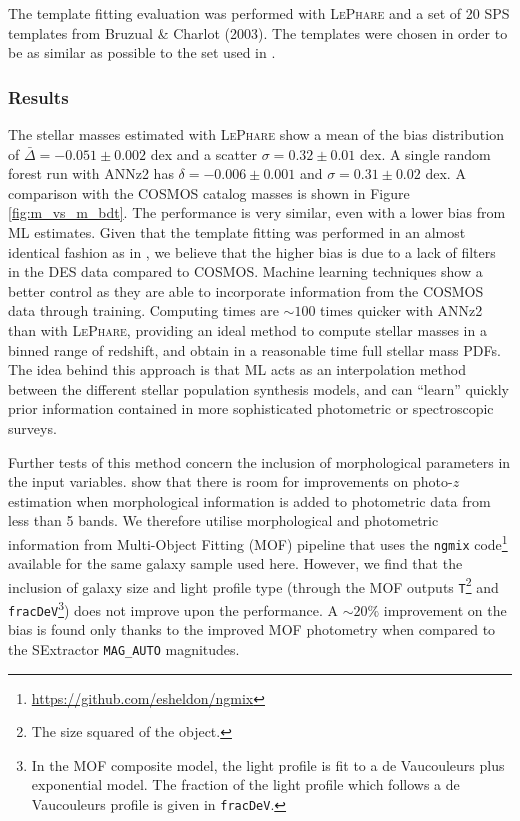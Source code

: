 The template fitting evaluation was performed with \textsc{LePhare} and a set of 20 SPS templates from Bruzual \& Charlot (2003). The templates were chosen in order to be as similar as possible to the set used in \citet{laigle}. 

\subsubsection{Results}
The stellar masses estimated with \textsc{LePhare} show a mean of the bias distribution of $\bar{\Delta}=-0.051\pm 0.002$ dex and a scatter $\sigma = 0.32\pm 0.01$ dex. A single random forest run with ANNz2 has $\delta=-0.006\pm 0.001$ and $\sigma=0.31\pm 0.02$ dex. A comparison with the COSMOS catalog masses is shown in Figure \ref{fig:m_vs_m_bdt}. The performance is very similar, even with a lower bias from ML estimates. Given that the template fitting was performed in an almost identical fashion as in \citet{laigle}, we believe that the higher bias is due to a lack of filters in the DES data compared to COSMOS. Machine learning techniques show a better control as they are able to incorporate information from the COSMOS data through training. Computing times are $\sim 100$ times quicker with ANNz2 than with \textsc{LePhare}, providing an ideal method to compute stellar masses in a binned range of redshift, and obtain in a reasonable time full stellar mass PDFs.
The idea behind this approach is that ML acts as an interpolation method between the different stellar population synthesis models, and can ``learn'' quickly prior information contained in more sophisticated photometric or spectroscopic surveys.

Further tests of this method concern the inclusion of morphological parameters in the input variables. \citet{soo} show that there is room for improvements on photo-$z$ estimation when morphological information is added to photometric data from less than 5 bands. We therefore utilise morphological and photometric information from Multi-Object Fitting (MOF) pipeline that uses the \texttt{ngmix} code\footnote{\url{https://github.com/esheldon/ngmix}} available for the same galaxy sample used here. However, we find that the inclusion of galaxy size and light profile type (through the MOF outputs \texttt{T}\footnote{The size squared of the object.} and \texttt{fracDeV}\footnote{In the MOF composite model, the light profile is fit to a de Vaucouleurs plus exponential model. The fraction of the light profile which follows a de Vaucouleurs profile is given in \texttt{fracDeV}.}) does not improve upon the performance. A $\sim 20\%$ improvement on the bias is found only thanks to the improved MOF photometry when compared to the SExtractor \texttt{MAG\_AUTO} magnitudes. %


